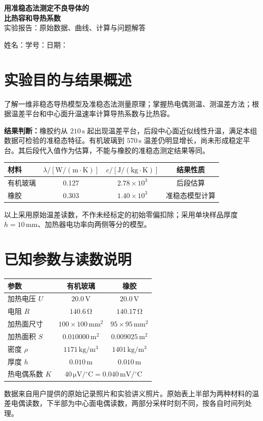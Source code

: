 \documentclass[UTF8,a4paper,11pt]{ctexart}
\newcommand{\unit}[1]{\,\mathrm{#1}}
\begin{document}
\begin{center}
{\LARGE\bfseries 用准稳态法测定不良导体的\\[5pt]比热容和导热系数}\\[12pt]
{\large 实验报告：原始数据、曲线、计算与问题解答}
\end{center}
\noindent 姓名：\underline{\hspace{2.6cm}}\quad 学号：\underline{\hspace{3.0cm}}\quad 日期：\underline{\hspace{2.3cm}}

\section{实验目的与结果概述}
了解一维非稳态导热模型及准稳态法测量原理；掌握热电偶测温、测温差方法；根据温差平台和中心面升温速率计算导热系数与比热容。

\textbf{结果判断：}橡胶约从 $210\unit{s}$ 起出现温差平台，后段中心面近似线性升温，满足本组数据可检验的准稳态特征。有机玻璃到 $570\unit{s}$ 温差仍明显增长，尚未形成稳定平台。其后段代入值作为估算，不能与橡胶的准稳态测定结果等同。

\begin{center}
\begin{tabular}{lccc}
\toprule 材料 & $\lambda/[\mathrm{W/(m\cdot K)}]$ & $c/[\mathrm{J/(kg\cdot K)}]$ & 结果性质\\
\midrule 有机玻璃 & 0.127 & $2.78\times10^3$ & 后段估算\\
橡胶 & 0.303 & $1.40\times10^3$ & 准稳态模型计算\\\bottomrule
\end{tabular}
\end{center}
以上采用原始温差读数，不作未经标定的初始零偏扣除；采用单块样品厚度 $h=10\unit{mm}$、加热器电功率向两侧等分的模型。

\section{已知参数与读数说明}
\begin{center}
\begin{tabular}{lcc}\toprule 参数 & 有机玻璃 & 橡胶\\\midrule
加热电压 $U$ & $20.0\unit{V}$ & $20.0\unit{V}$\\
电阻 $R$ & $140.6\unit{\Omega}$ & $140.17\unit{\Omega}$\\
加热面尺寸 & $100\times100\unit{mm^2}$ & $95\times95\unit{mm^2}$\\
加热面积 $S$ & $0.010000\unit{m^2}$ & $0.009025\unit{m^2}$\\
密度 $\rho$ & $1171\unit{kg/m^3}$ & $1401\unit{kg/m^3}$\\
厚度 $h$ & $0.010\unit{m}$ & $0.010\unit{m}$\\
热电偶系数 $K$ & \multicolumn{2}{c}{$40\unit{\mu V/{}^\circ C}=0.040\unit{mV/{}^\circ C}$}\\\bottomrule
\end{tabular}
\end{center}
数据来自用户提供的原始记录照片和实验讲义照片。原始表上半部为两种材料的温差电偶读数，下半部为中心面电偶读数，两部分采样时刻不同，按各自时间列处理。
\end{document}
